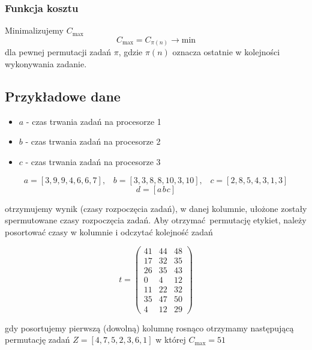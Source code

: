 \subsubsection{Funkcja kosztu}
Minimalizujemy $C_{\text{max}}$
$$ C_{\text{max}} = C_{\pi(n)} \longrightarrow \text{min} $$
dla pewnej permutacji zadań $\pi$, gdzie $\pi(n)$ oznacza ostatnie w kolejności wykonywania zadanie.

\subsection{Przykładowe dane}
\begin{itemize}
    \item $a$ - czas trwania zadań na procesorze 1
    \item $b$ - czas trwania zadań na procesorze 2
    \item $c$ - czas trwania zadań na procesorze 3
\end{itemize}
$$
a = [3,9,9,4,6,6,7], \hspace{10pt}
b = [3,3,8,8,10,3,10], \hspace{10pt}
c = [2,8,5,4,3,1,3]
$$
$$ d = [a\hspace{1pt}b\hspace{1pt}c] $$

otrzymujemy wynik (czasy rozpoczęcia zadań), w danej kolumnie, ułożone zostały spermutowane czasy rozpoczęcia zadań. Aby otrzymać permutację etykiet, należy posortować czasy w kolumnie i odczytać kolejność zadań

$$ t = \left( \begin{matrix} 41 & 44 & 48 \\ 17 & 32 & 35 \\ 26 & 35 & 43 \\ 0 & 4 & 12 \\ 11 & 22 & 32 \\ 35 & 47 & 50 \\ 4 & 12 & 29 \end{matrix} \right) $$

gdy posortujemy pierwszą (dowolną) kolumnę rosnąco otrzymamy następującą permutację zadań
$ Z = [4, 7, 5, 2, 3, 6, 1] $ w której $C_{\text{max}} = 51$
